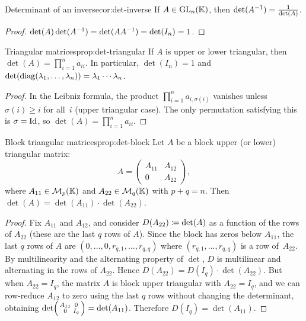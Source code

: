\begin{corollary}{Determinant of an inverse}{cor:det-inverse}
If $A\in\operatorname{GL}_n({\mathbb{K}})$, then $\det({A}^{-1}) = \frac{1}{\det(A)}$.
\end{corollary}

\begin{proof}
$\det(A)\det({A}^{-1}) = \det(A{A}^{-1}) = \det(I_n)=1$.
\end{proof}

\begin{proposition}{Triangular matrices}{prop:det-triangular}
If $A$ is upper or lower triangular, then
$\det(A) = \prod_{i=1}^n a_{ii}$.
In particular, $\det(I_n)=1$ and
$\det(\operatorname{diag}(\lambda_1,\ldots,\lambda_n)) = \lambda_1\cdots\lambda_n$.
\end{proposition}

\begin{proof}
In the Leibniz formula, the product $\prod_{i=1}^n a_{i,\sigma(i)}$
vanishes unless $\sigma(i)\geq i$ for all~$i$ (upper triangular case).
The only permutation satisfying this is $\sigma=\operatorname{Id}$, so
$\det(A) = \prod_{i=1}^n a_{ii}$.
\end{proof}

\begin{proposition}{Block triangular matrices}{prop:det-block}
Let $A$ be a block upper (or lower) triangular matrix:
\[
  A = \begin{pmatrix} A_{11} & A_{12} \\ 0 & A_{22} \end{pmatrix},
\]
where $A_{11}\in\mathcal{M}_p({\mathbb{K}})$ and $A_{22}\in\mathcal{M}_q({\mathbb{K}})$ with $p+q=n$.
Then $\det(A) = \det(A_{11})\cdot\det(A_{22})$.
\end{proposition}

\begin{proof}
Fix $A_{11}$ and $A_{12}$, and consider
$D(A_{22}) \coloneqq \det(A)$ as a function of the rows of $A_{22}$
(these are the last $q$ rows of $A$). Since the block has zeros below
$A_{11}$, the last $q$ rows of $A$ are
$(0,\ldots,0,r_{q,1},\ldots,r_{q,q})$ where $(r_{q,1},\ldots,r_{q,q})$
is a row of~$A_{22}$. By multilinearity and the alternating property
of $\det$, $D$ is multilinear and alternating in the rows of $A_{22}$.
Hence $D(A_{22}) = D(I_q)\cdot\det(A_{22})$. But when $A_{22}=I_q$,
the matrix $A$ is block upper triangular with $A_{22}=I_q$, and we
can row-reduce $A_{12}$ to zero using the last $q$ rows without
changing the determinant, obtaining
$\det\begin{psmallmatrix} A_{11} & 0 \\ 0 & I_q\end{psmallmatrix}
= \det(A_{11})$.
Therefore $D(I_q)=\det(A_{11})$.
\end{proof}


